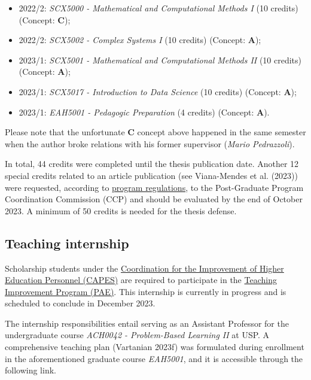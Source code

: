 \documentclass[
  12pt,
  a4paper,
  oneside]{tesesusp}
\providecommand{\tightlist}{%
  \setlength{\itemsep}{0pt}\setlength{\parskip}{0pt}}\usepackage{longtable,booktabs,array}
\begin{document}
\begin{itemize}
\tightlist
\item
  2022/2: \emph{SCX5000 - Mathematical and Computational Methods I} (10
  credits) (Concept: \textbf{C});
\item
  2022/2: \emph{SCX5002 - Complex Systems I} (10 credits) (Concept:
  \textbf{A});
\item
  2023/1: \emph{SCX5001 - Mathematical and Computational Methods II} (10
  credits) (Concept: \textbf{A});
\item
  2023/1: \emph{SCX5017 - Introduction to Data Science} (10 credits)
  (Concept: \textbf{A});
\item
  2023/1: \emph{EAH5001 - Pedagogic Preparation} (4 credits) (Concept:
  \textbf{A}).
\end{itemize}

Please note that the unfortunate \textbf{C} concept above happened in
the same semester when the author broke relations with his former
supervisor (\emph{Mario Pedrazzoli}).

In total, 44 credits were completed until the thesis publication date.
Another 12 special credits related to an article publication (see
Viana-Mendes et al. (2023)) were requested, according to
\href{https://leginf.usp.br/?resolucao=resolucao-copgr-no-7829-de-03-de-outubro-de-2019}{program
regulations}, to the Post-Graduate Program Coordination Commission (CCP)
and should be evaluated by the end of October 2023. A minimum of 50
credits is needed for the thesis defense.

\hypertarget{teaching-internship}{%
\subsection{Teaching internship}\label{teaching-internship}}

Scholarship students under the
\href{https://www.gov.br/capes/}{Coordination for the Improvement of
Higher Education Personnel (CAPES)} are required to participate in the
\href{www5.each.usp.br/pae/}{Teaching Improvement Program (PAE)}. This
internship is currently in progress and is scheduled to conclude in
December 2023.

The internship responsibilities entail serving as an Assistant Professor
for the undergraduate course \emph{ACH0042 - Problem-Based Learning II}
at USP. A comprehensive teaching plan (Vartanian 2023f) was formulated
during enrollment in the aforementioned graduate course \emph{EAH5001},
and it is accessible through the following link.
\end{document}
